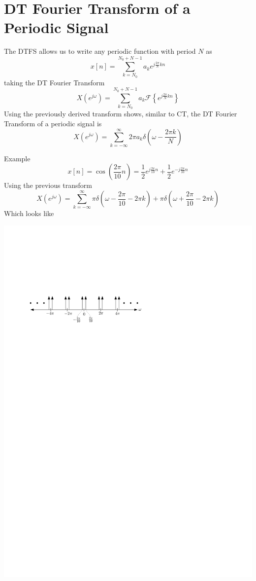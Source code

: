 \section{DT Fourier Transform of a Periodic Signal}

The DTFS allows us to write any periodic function with period $N$ as
\[
x[n] = \sum\limits_{k = N_0}^{N_0 + N -1} a_k e^{j\frac{2\pi}{N}kn}  
\]
taking the DT Fourier Transform 
\[
X\left(e^{j\omega}\right) = \sum\limits_{k = N_0}^{N_0 + N -1} a_k \mathcal{F}\left\{e^{j\frac{2\pi}{N}kn}\right\}
\]
Using the previously derived transform shows, similar to CT, the DT Fourier Transform of a periodic signal is 
\[
X\left(e^{j\omega}\right) = \sum\limits_{k = -\infty}^{\infty} 2\pi a_k \delta\left(\omega - \frac{2\pi k}{N}\right)  
\]

Example
  \[
  x[n] = \cos\left(\frac{2\pi}{10} n\right) = \frac{1}{2}e^{j\frac{2\pi}{10} n} + \frac{1}{2}e^{-j\frac{2\pi}{10} n}
  \]
  Using the previous transform
  \[
  X\left(e^{j\omega}\right) =  \sum\limits_{k = -\infty}^{\infty} \pi \delta\left(\omega - \frac{2\pi}{10} -2\pi k\right) + \pi \delta\left(\omega + \frac{2\pi}{10} -2\pi k\right)
  \]
  Which looks like
  \begin{center}
  \includegraphics[scale=1]{graphics/dtft-periodic-ex2.pdf}
\end{center}

